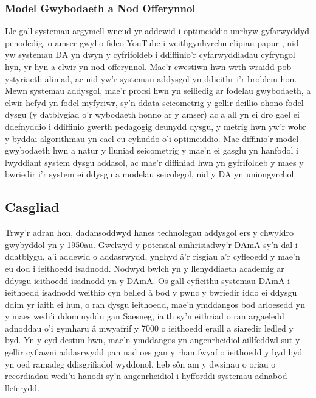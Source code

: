         \subsubsection{Model Gwybodaeth a Nod Offerynnol}
Lle gall systemau argymell wneud yr addewid i optimeiddio unrhyw gyfarwyddyd penodedig, o amser gwylio fideo YouTube i weithgynhyrchu clipiau papur \parencite{bostrom_ethical_2003}, nid yw systemau DA yn dwyn y cyfrifoldeb i ddiffinio'r cyfarwyddiadau cyfryngol hyn, yr hyn a elwir yn nod offerynnol. Mae'r cwestiwn hwn wrth wraidd pob ystyriaeth aliniad, ac nid yw'r systemau addysgol yn ddieithr i'r broblem hon. Mewn systemau addysgol, mae'r procsi hwn yn seiliedig ar fodelau gwybodaeth, a elwir hefyd yn fodel myfyriwr, sy'n ddata seicometrig y gellir deillio ohono fodel dysgu (y datblygiad o'r wybodaeth honno ar y amser) ac a all yn ei dro gael ei ddefnyddio i ddiffinio gwerth pedagogig deunydd dysgu, y metrig hwn yw'r wobr y byddai algorithmau yn cael eu cyhuddo o'i optimeiddio. Mae diffinio'r model gwybodaeth hwn a natur y lluniad seicometrig y mae'n ei gasglu yn hanfodol i lwyddiant system dysgu addasol, ac mae'r diffiniad hwn yn gyfrifoldeb y maes y bwriedir i'r system ei ddysgu a modelau seicolegol, nid y DA yn uniongyrchol.

    \subsection{Casgliad}
Trwy'r adran hon, dadansoddwyd hanes technolegau addysgol ers y chwyldro gwybyddol yn y 1950au. Gwelwyd y potensial amhrisiadwy'r DAmA sy'n dal i ddatblygu, a'i addewid o addasrwydd, ynghyd â'r risgiau a'r cyfleoedd y mae'n eu dod i ieithoedd isadnodd. Nodwyd bwlch yn y llenyddiaeth academig ar ddysgu ieithoedd isadnodd yn y DAmA. Os gall cyfieithu systemau DAmA i ieithoedd isadnodd weithio cyn belled â bod y pwnc y bwriedir iddo ei ddysgu ddim yr iaith ei hun, o ran dysgu ieithoedd, mae'n ymddangos bod arloesedd yn y maes wedi'i ddominyddu gan Saesneg, iaith sy'n eithriad o ran argaeledd adnoddau o'i gymharu â mwyafrif y 7000 o ieithoedd eraill a siaredir ledled y byd. Yn y cyd-destun hwn, mae'n ymddangos yn angenrheidiol aillfeddwl sut y gellir cyflawni addasrwydd pan nad oes gan y rhan fwyaf o ieithoedd y byd hyd yn oed ramadeg ddisgrifiadol wyddonol, heb sôn am y dwsinau o oriau o recordiadau wedi'u hanodi sy'n angenrheidiol i hyfforddi systemau adnabod lleferydd.